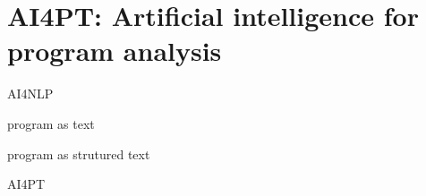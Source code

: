 \section{AI4PT: Artificial intelligence for program analysis}

AI4NLP

program as text

program as strutured text

AI4PT
